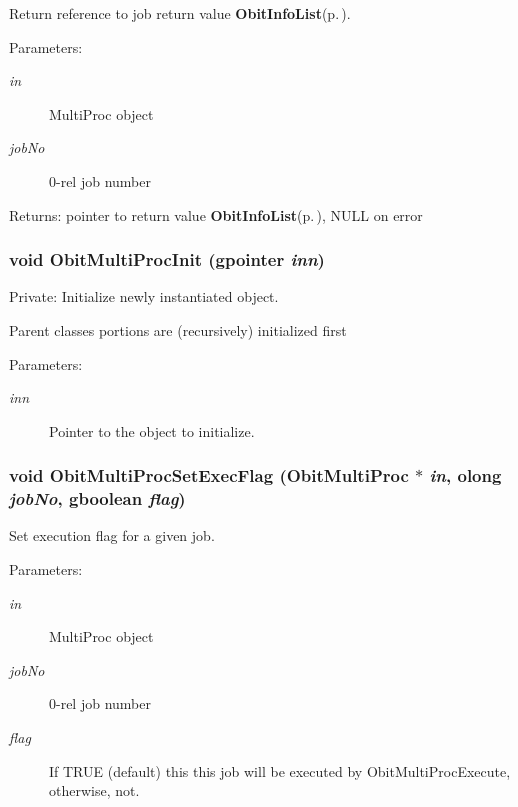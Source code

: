 Return reference to job return value {\bf Obit\-Info\-List}{\rm (p.\,\pageref{structObitInfoList})}. 

\begin{Desc}
\item[Parameters:]
\begin{description}
\item[{\em in}]Multi\-Proc object \item[{\em job\-No}]0-rel job number \end{description}
\end{Desc}
\begin{Desc}
\item[Returns:]pointer to return value {\bf Obit\-Info\-List}{\rm (p.\,\pageref{structObitInfoList})}, NULL on error \end{Desc}
\subsubsection{\setlength{\rightskip}{0pt plus 5cm}void Obit\-Multi\-Proc\-Init (gpointer {\em inn})}\label{ObitMultiProc_8c_a3}


Private: Initialize newly instantiated object. 

Parent classes portions are (recursively) initialized first \begin{Desc}
\item[Parameters:]
\begin{description}
\item[{\em inn}]Pointer to the object to initialize. \end{description}
\end{Desc}
\subsubsection{\setlength{\rightskip}{0pt plus 5cm}void Obit\-Multi\-Proc\-Set\-Exec\-Flag ({\bf Obit\-Multi\-Proc} $\ast$ {\em in}, {\bf olong} {\em job\-No}, gboolean {\em flag})}\label{ObitMultiProc_8c_a19}


Set execution flag for a given job. 

\begin{Desc}
\item[Parameters:]
\begin{description}
\item[{\em in}]Multi\-Proc object \item[{\em job\-No}]0-rel job number \item[{\em flag}]If TRUE (default) this this job will be executed by Obit\-Multi\-Proc\-Execute, otherwise, not. \end{description}
\end{Desc}
